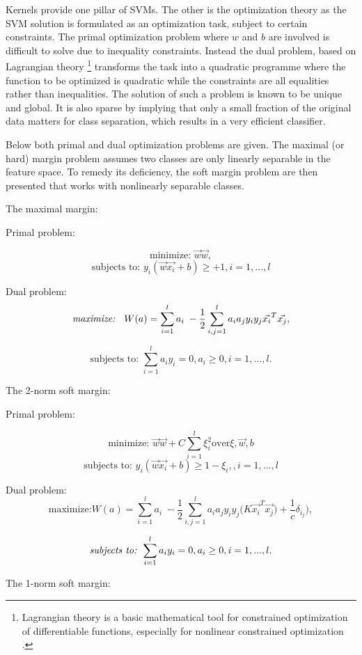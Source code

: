 Kernels provide one pillar of SVMs. The other is the optimization theory as the SVM solution is formulated as an optimization task, subject to certain constraints. The primal optimization problem where \( w \) and \( b \) are involved is difficult to solve due to inequality constraints. Instead the dual problem, based on  Lagrangian theory \footnote{Lagrangian theory is a basic mathematical tool for constrained optimization of differentiable functions, especially for nonlinear constrained optimization \cite{Li:2008}.} transforms the task into a quadratic programme where the function to be optimized is quadratic while the constraints are all equalities rather than inequalities. The solution of such a problem is known to be unique and global. It is also sparse by implying that only a small fraction of the original data matters for class separation, which results in a very efficient classifier.

Below both primal and dual optimization problems are given. The maximal (or hard) margin problem assumes two classes are only linearly separable in the feature space. To remedy its deficiency, the soft margin problem are then presented that works with nonlinearly separable classes.

The maximal margin:

Primal problem:

\[\textrm{minimize: } \vec{w} \vec{w},\] 
\[\textrm{subjects to: } y_i(\vec{w}\vec{x_i} + b) \geq +1, i = 1, ...,l \] 

Dual problem:
\[\textrm{\textit{maximize: } } W(a) =  \sum_{i=1}^{l} a_i \; - \frac{1}{2}\sum_{i,j = 1}^{l}a_i a_j y_i y_j \vec{x_i}^T \vec{x_j}, \] 

\[\textrm{subjects to: } \sum_{i=1}^{l}a_i y_i = 0, a_i \geq 0, i = 1,...,l.   \] 

The 2-norm soft margin:

Primal problem:

\[\textrm{minimize: } \vec{w} \vec{w} + C \sum_{i=1}^{l} \xi^2_i \textrm{over} \xi,\vec{w},b\] 
\[\textrm{subjects to: } y_i(\vec{w}\vec{x_i} + b) \geq 1 - \xi_i,, i = 1, ...,l \] 

Dual problem:
\[\textrm{maximize:} W(a) =  \sum_{i=1}^{l} a_i \; - \frac{1}{2}\sum_{i,j = 1}^{l}a_i a_j y_i y_j \Big( K\vec{x_i}^T \vec{x_j}) + \frac{1}{c}\delta_i_j \Big), \] 

\[\textrm{\textit{subjects to: }} \sum_{i=1}^{l}a_i y_i = 0, a_i \geq 0, i = 1,...,l.   \] 


The 1-norm soft margin:

